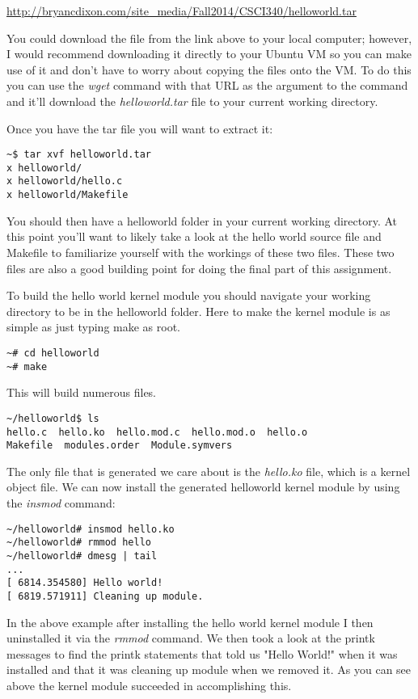 \documentclass[11pt]{article}
\begin{document}
{\url{http://bryancdixon.com/site_media/Fall2014/CSCI340/helloworld.tar}}

You could download the file from the link above to your local computer; however, I would recommend downloading it directly to your Ubuntu VM so you can make use of it and don't have to worry about copying the files onto the VM. To do this you can use the {\it wget} command with that URL as the argument to the command and it'll download the {\it helloworld.tar} file to your current working directory.

Once you have the tar file you will want to extract it:

\begin{verbatim}
~$ tar xvf helloworld.tar
x helloworld/
x helloworld/hello.c
x helloworld/Makefile
\end{verbatim}

You should then have a helloworld folder in your current working directory. At this point you'll want to likely take a look at the hello world source file and Makefile to familiarize yourself with the workings of these two files. These two files are also a good building point for doing the final part of this assignment. 

To build the hello world kernel module you should navigate your working directory to be in the helloworld folder. Here to make the kernel module is as simple as just typing make as root.

\begin{verbatim}
~# cd helloworld
~# make
\end{verbatim}

\newpage

This will build numerous files.

\begin{verbatim}
~/helloworld$ ls
hello.c  hello.ko  hello.mod.c  hello.mod.o  hello.o  
Makefile  modules.order  Module.symvers
\end{verbatim}

The only file that is generated we care about is the {\it hello.ko} file, which is a kernel object file. We can now install the generated helloworld kernel module by using the {\it insmod} command:

\begin{verbatim}
~/helloworld# insmod hello.ko
~/helloworld# rmmod hello
~/helloworld# dmesg | tail
...
[ 6814.354580] Hello world!
[ 6819.571911] Cleaning up module.
\end{verbatim}

In the above example after installing the hello world kernel module I then uninstalled it via the {\it rmmod} command. We then took a look at the printk messages to find the printk statements that told us "Hello World!" when it was installed and that it was cleaning up module when we removed it. As you can see above the kernel module succeeded in accomplishing this.
\end{document}
